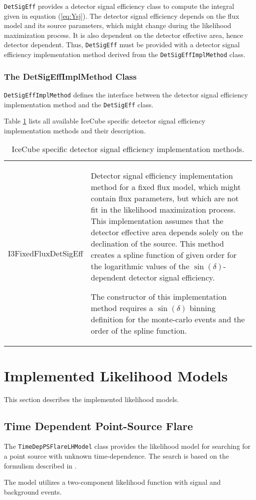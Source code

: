 \documentclass{article}
\newcommand{\eq}[1]{(\ref{#1})}
\newcommand{\code}[1]{\texttt{#1}}
\newcommand{\class}[1]{\colorbox{blue!30}{\code{#1}}}
\begin{document}
\class{DetSigEff} provides a detector signal efficiency class to
compute the integral given in equation \eq{eq:Ysj}. The detector signal
efficiency depends on the flux model and its source parameters, which might
change during the likelihood maximization process. It is also dependent on the
detector effective area, hence detector dependent. Thus, \class{DetSigEff} must
be provided with a detector signal efficiency implementation method derived from
the \class{DetSigEffImplMethod} class.

\subsubsection{The DetSigEffImplMethod Class}

\class{DetSigEffImplMethod} defines the interface between the detector signal
efficiency implementation method and the \class{DetSigEff} class.

Table \ref{tbl:I3DetSigEffImplMethod} lists all available IceCube specific
detector signal efficiency implementation methods and their description.
\begin{table}
\caption{IceCube specific detector signal efficiency implementation methods.}
\label{tbl:I3DetSigEffImplMethod}

\begin{tabular}{l | p{10cm}}
\hline
I3FixedFluxDetSigEff & Detector signal efficiency implementation method for a
    fixed flux model, which might contain flux parameters, but which
    are not fit in the likelihood maximization process.
    This implementation assumes that the detector effective
    area depends solely on the declination of the source. This method creates
    a spline function of given order for the logarithmic values of the
    $\sin(\delta)$-dependent detector signal efficiency.

    The constructor of this implementation method requires a $\sin(\delta)$
    binning definition for the monte-carlo events and the order of the spline
    function.
\end{tabular}
\end{table}



\section{Implemented Likelihood Models}
This section describes the implemented likelihood models.

\subsection{Time Dependent Point-Source Flare}

The \class{TimeDepPSFlareLHModel} class provides the likelihood model for searching for a point source with unknown time-dependence.
The search is based on the formulism described in \cite{TimeDepPSSearchMethods2010}.

The model utilizes a two-component likelihood function with signal and background events.



\end{document}
